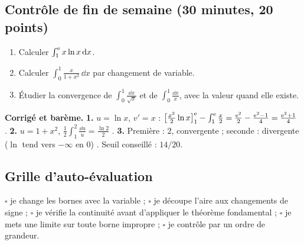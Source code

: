 \subsection{Contrôle de fin de semaine (30 minutes, 20 points)}
\begin{enumerate}
 \item {} Calculer $\int_1^{\mathrm{e}}x\ln x\,\mathrm{d} x$.
 \item {} Calculer $\int_0^1\frac x{1+x^2}\,\dd x$ par changement de variable.
 \item {} Étudier la convergence de $\int_0^1\frac{\dd x}{\sqrt x}$ et de $\int_0^1\frac{\dd x}x$, avec la valeur quand elle existe.
\end{enumerate}
\ifcorr
\textbf{Corrigé et barème.} \textbf{1.} $u=\ln x$, $v'=x$ : $\big[\frac{x^2}2\ln x\big]_1^{\mathrm{e}}-\int_1^{\mathrm{e}}\frac x2=\frac{\mathrm{e}^2}2-\frac{\mathrm{e}^2-1}4=\frac{\mathrm{e}^2+1}4$ . \textbf{2.} $u=1+x^2$, $\frac12\int_1^2\frac{\dd u}u=\frac{\ln2}2$ . \textbf{3.} Première : $2$, convergente  ; seconde : divergente ($\ln$ tend vers $-\infty$ en $0$) . Seuil conseillé : $14/20$.
\fi

\subsection{Grille d'auto-évaluation}
$\square$ je change les bornes avec la variable ; $\square$ je découpe l'aire aux changements de signe ; $\square$ je vérifie la continuité avant d'appliquer le théorème fondamental ; $\square$ je mets une limite sur toute borne impropre ; $\square$ je contrôle par un ordre de grandeur.
